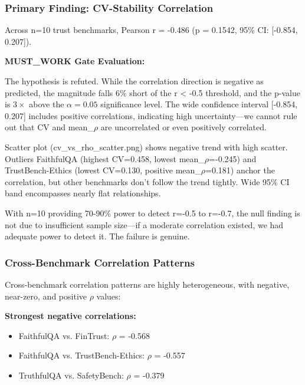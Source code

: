 
\subsubsection{Primary Finding: CV-Stability Correlation}

Across n=10 trust benchmarks, Pearson r = -0.486 (p = 0.1542, 95\% CI: [-0.854, 0.207]).

\textbf{MUST\_WORK Gate Evaluation:}

\begin{table}[htbp]
\centering
{}
\end{table}

The hypothesis is refuted. While the correlation direction is negative as predicted, the magnitude falls 6\% short of the r < -0.5 threshold, and the p-value is $3\times$ above the $\alpha =0.05$ significance level. The wide confidence interval [-0.854, 0.207] includes positive correlations, indicating high uncertainty---we cannot rule out that CV and mean\_$\rho$ are uncorrelated or even positively correlated.

Scatter plot (cv\_vs\_rho\_scatter.png) shows negative trend with high scatter. Outliers FaithfulQA (highest CV=0.458, lowest mean\_$\rho$=-0.245) and TrustBench-Ethics (lowest CV=0.130, positive mean\_$\rho$=0.181) anchor the correlation, but other benchmarks don't follow the trend tightly. Wide 95\% CI band encompasses nearly flat relationships.

With n=10 providing 70-90\% power to detect r=-0.5 to r=-0.7, the null finding is not due to insufficient sample size---if a moderate correlation existed, we had adequate power to detect it. The failure is genuine.

\subsubsection{Cross-Benchmark Correlation Patterns}

Cross-benchmark correlation patterns are highly heterogeneous, with negative, near-zero, and positive $\rho$ values:

\textbf{Strongest negative correlations:}
\begin{itemize}
\item FaithfulQA vs. FinTrust: $\rho$ = -0.568
\item FaithfulQA vs. TrustBench-Ethics: $\rho$ = -0.557
\item TruthfulQA vs. SafetyBench: $\rho$ = -0.379
\end{itemize}

